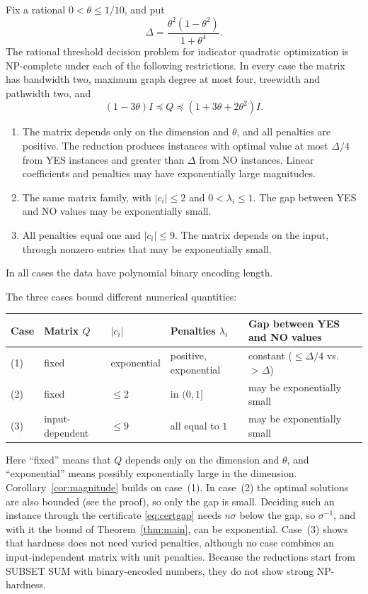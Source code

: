 \begin{theorem}\label{thm:hardness}
Fix a rational $0<\theta\le1/10$, and put
\[
 \Delta=\frac{\theta^2(1-\theta^2)}{1+\theta^4}.
\]
The rational threshold decision problem for indicator quadratic optimization
is NP-complete under each of the following restrictions. In every case the
matrix has bandwidth two, maximum graph degree at most four, treewidth and
pathwidth two, and
\begin{equation}\label{eq:hard-spectrum}
 (1-3\theta)I\preceq Q\preceq(1+3\theta+2\theta^2)I.
\end{equation}
\begin{enumerate}
\item[(1)] The matrix depends only on the dimension and $\theta$, and
all penalties are positive. The reduction produces instances with
optimal value at most $\Delta/4$ from YES instances and greater than
$\Delta$ from NO instances. Linear coefficients and penalties may have
exponentially large magnitudes.
\item[(2)] The same matrix family, with $|c_i|\le2$ and
$0<\lambda_i\le1$. The gap between YES and NO values may be
exponentially small.
\item[(3)] All penalties equal one and $|c_i|\le9$. The matrix depends
on the input, through nonzero entries that may be exponentially small.
\end{enumerate}
In all cases the data have polynomial binary encoding length.
\end{theorem}

The three cases bound different numerical quantities:
\begin{center}
\small
\begin{tabular}{@{}lllll@{}}
Case & Matrix $Q$ & $|c_i|$ & Penalties $\lambda_i$
     & Gap between YES and NO values\\
\hline
(1) & fixed & exponential & positive, exponential
    & constant ($\le\Delta/4$ vs.\ $>\Delta$)\\
(2) & fixed & $\le2$ & in $(0,1]$ & may be exponentially small\\
(3) & input-dependent & $\le9$ & all equal to $1$
    & may be exponentially small
\end{tabular}
\end{center}
Here ``fixed'' means that $Q$ depends only on the dimension and
$\theta$, and ``exponential'' means possibly exponentially large in the
dimension. Corollary~\ref{cor:magnitude} builds on case~(1). In
case~(2) the optimal solutions are also bounded (see the proof), so only
the gap is small. Deciding such an instance through the certificate
\eqref{eq:certgap} needs $n\sigma$ below the gap, so $\sigma^{-1}$, and
with it the bound of Theorem~\ref{thm:main}, can be exponential.
Case~(3) shows that hardness does not need varied penalties, although no
case combines an input-independent matrix with unit penalties. Because
the reductions start from SUBSET SUM with binary-encoded numbers, they
do not show strong NP-hardness.

